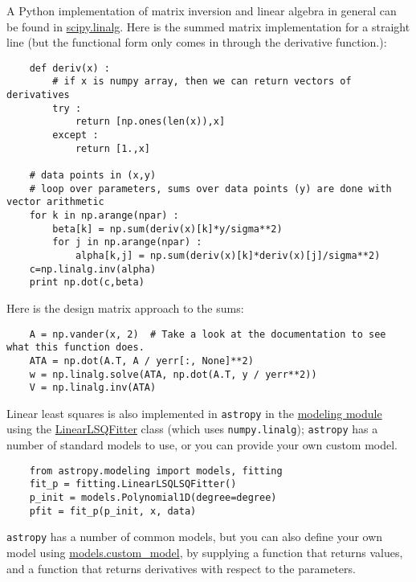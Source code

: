 \documentclass{article}
\begin{document}
A Python implementation of matrix inversion and linear algebra in general
can be found in
\href{http://docs.scipy.org/doc/scipy/reference/tutorial/linalg.html}
{scipy.linalg}.
Here is the summed matrix implementation for a straight line
(but the functional form only comes in through the derivative function.):
\begin{lstlisting}
    def deriv(x) :
        # if x is numpy array, then we can return vectors of derivatives
        try :
            return [np.ones(len(x)),x]
        except :
            return [1.,x]

    # data points in (x,y)
    # loop over parameters, sums over data points (y) are done with vector arithmetic
    for k in np.arange(npar) :
        beta[k] = np.sum(deriv(x)[k]*y/sigma**2)
        for j in np.arange(npar) :
            alpha[k,j] = np.sum(deriv(x)[k]*deriv(x)[j]/sigma**2)
    c=np.linalg.inv(alpha)
    print np.dot(c,beta)
\end{lstlisting}
Here is the design matrix approach to the sums:
\begin{lstlisting}
    A = np.vander(x, 2)  # Take a look at the documentation to see what this function does.
    ATA = np.dot(A.T, A / yerr[:, None]**2)
    w = np.linalg.solve(ATA, np.dot(A.T, y / yerr**2))
    V = np.linalg.inv(ATA)
\end{lstlisting}
Linear least squares is also implemented in \texttt{astropy} in the
\href{http://astropy.readthedocs.org/en/v1.0.6/modeling/index.html}
{modeling module} using the
\href{http://astropy.readthedocs.org/en/v1.0.6/api/astropy.modeling.fitting.LinearLSQFitter.html#astropy.modeling.fitting.LinearLSQFitter}
{LinearLSQFitter} class (which uses {\tt numpy.linalg});
{\tt astropy} has a number of standard models to use,
or you can provide your own custom model.
\begin{lstlisting}
    from astropy.modeling import models, fitting
    fit_p = fitting.LinearLSQLSQFitter()
    p_init = models.Polynomial1D(degree=degree)
    pfit = fit_p(p_init, x, data)
\end{lstlisting}

\texttt{astropy} has a number of common models, but you can also define your own
model using
\href{http://astronomy.nmsu.edu/holtz/a575/ay575notes/astropy.readthedocs.org/en/v1.0.6/api/astropy.modeling.custom_model.html#astropy.modeling.custom_model}
{models.custom\_model}, by supplying a function that returns
values, and a function that returns derivatives with respect to the
parameters.
\end{document}
